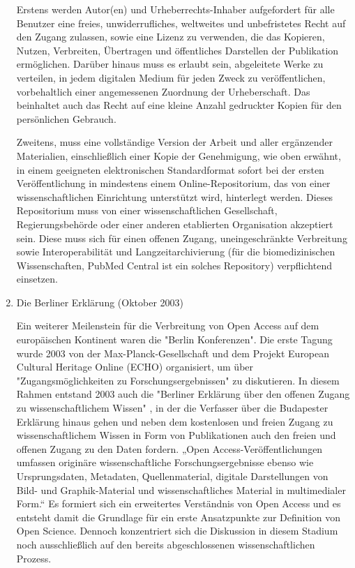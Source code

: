 \begin{enumerate}
Erstens werden Autor(en) und Urheberrechts-Inhaber aufgefordert für alle Benutzer eine freies, unwiderrufliches, weltweites und unbefristetes Recht auf den Zugang zulassen, sowie eine Lizenz zu verwenden, die das Kopieren, Nutzen, Verbreiten, Übertragen und öffentliches Darstellen der Publikation ermöglichen. Darüber hinaus muss es erlaubt sein, abgeleitete Werke zu verteilen, in jedem digitalen Medium für jeden Zweck zu veröffentlichen, vorbehaltlich einer angemessenen Zuordnung der Urheberschaft. Das beinhaltet auch das Recht auf eine kleine Anzahl gedruckter Kopien für den persönlichen Gebrauch.

Zweitens, muss eine vollständige Version der Arbeit und aller ergänzender Materialien, einschließlich einer Kopie der Genehmigung, wie oben erwähnt, in einem geeigneten elektronischen Standardformat sofort bei der ersten Veröffentlichung in mindestens einem Online-Repositorium, das von einer wissenschaftlichen Einrichtung unterstützt wird, hinterlegt werden. Dieses Repositorium muss von einer wissenschaftlichen Gesellschaft, Regierungsbehörde oder einer anderen etablierten Organisation akzeptiert sein. Diese muss sich für einen offenen Zugang, uneingeschränkte Verbreitung sowie Interoperabilität und Langzeitarchivierung (für die biomedizinischen Wissenschaften, PubMed Central ist ein solches Repository) verpflichtend einsetzen.

\item Die Berliner Erklärung (Oktober 2003)

Ein weiterer Meilenstein für die Verbreitung von Open Access auf dem europäischen Kontinent waren die "Berlin Konferenzen"\cite{CREATe_2014}. Die erste Tagung wurde 2003 von der Max-Planck-Gesellschaft und dem Projekt European Cultural Heritage Online (ECHO) organisiert, um über "Zugangsmöglichkeiten zu Forschungsergebnissen" zu diskutieren. In diesem Rahmen entstand 2003 auch die "Berliner Erklärung über den offenen Zugang zu wissenschaftlichem Wissen" \cite{berliner_erklaerung_2003}, in der die Verfasser über die Budapester Erklärung hinaus gehen und neben dem kostenlosen und freien Zugang zu wissenschaftlichem Wissen in Form von Publikationen auch den freien und offenen Zugang zu den Daten fordern. „Open Access-Veröffentlichungen umfassen originäre wissenschaftliche Forschungsergebnisse ebenso wie Ursprungsdaten, Metadaten, Quellenmaterial, digitale Darstellungen von Bild- und Graphik-Material und wissenschaftliches Material in multimedialer Form.“ \cite{berliner_erklaerung_2003} Es formiert sich ein erweitertes Verständnis von Open Access und es entsteht damit die Grundlage für ein erste Ansatzpunkte zur Definition von Open Science. Dennoch konzentriert sich die Diskussion in diesem Stadium noch ausschließlich auf den bereits abgeschlossenen wissenschaftlichen Prozess.

\end{enumerate}

